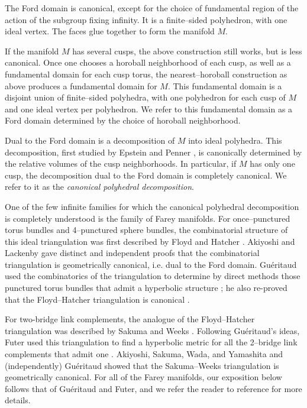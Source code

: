 \documentclass[11pt]{amsart}
\theoremstyle{plain}
\theoremstyle{definition}
\begin{document}
The Ford domain is canonical, except for the choice of fundamental
region of the action of the subgroup fixing infinity.  It is a
finite--sided polyhedron, with one ideal vertex.  The faces glue
together to form the manifold $M$.

If the manifold $M$ has several cusps, the above construction still
works, but is less canonical.  Once one chooses a horoball
neighborhood of each cusp, as well as a fundamental domain for each
cusp torus, the nearest--horoball construction as above produces a
fundamental domain for $M$.  This fundamental domain is a disjoint union 
of finite--sided polyhedra, with one polyhedron for each cusp of $M$
 and one ideal vertex per polyhedron.
We refer to this fundamental domain as a Ford domain determined by the choice
of horoball neighborhood.

Dual to the Ford domain is a decomposition of $M$ into ideal
polyhedra.  This decomposition, first studied by Epstein and Penner
\cite{epstein-penner}, is canonically determined by the relative
volumes of the cusp neighborhoods.  In particular, if $M$ has only one
cusp, the decomposition dual to the Ford domain is completely
canonical.  We refer to it as the \emph{canonical polyhedral
decomposition}.

One of the few infinite families for which the canonical polyhedral
decomposition is completely understood is the family of Farey
manifolds.  For once--punctured torus bundles and 4--punctured sphere
bundles, the combinatorial structure of this ideal triangulation was
first described by Floyd and Hatcher \cite{floyd-hatcher}.  Akiyoshi
\cite{akiyoshi} and Lackenby \cite{lackenby:punct} gave distinct and
independent proofs that the combinatorial triangulation is
geometrically canonical, i.e. dual to the Ford domain.  Gu\'eritaud
used the combinatorics of the triangulation to determine by direct
methods those punctured torus bundles that admit a hyperbolic
structure \cite{gf:two-bridge}; he also re-proved that the
Floyd--Hatcher triangulation is canonical \cite{gueritaud:thesis}.

For two-bridge link complements, the analogue of the Floyd--Hatcher
triangulation was described by Sakuma and Weeks \cite{sakuma-weeks}.
Following Gu\'eritaud's ideas, Futer used this triangulation to find a
hyperbolic metric for all the 2--bridge link complements that admit
one \cite[Appendix]{gf:two-bridge}.  Akiyoshi, Sakuma, Wada, and
Yamashita \cite{aswy} and (independently) Gu\'eritaud
\cite{gueritaud:thesis} showed that the Sakuma--Weeks triangulation is
geometrically canonical.  For all of the Farey manifolds, our
exposition below follows that of Gu\'eritaud and Futer, and we refer
the reader to reference \cite{gf:two-bridge} for more details.
\end{document}
